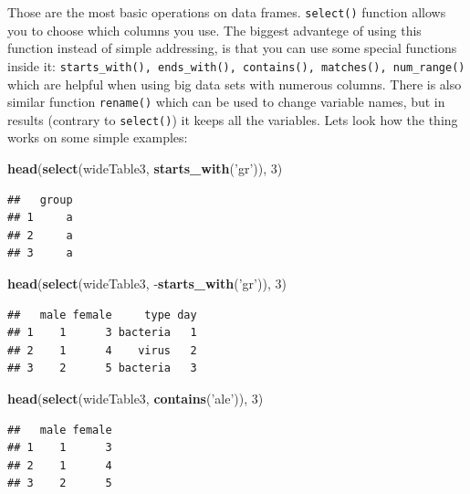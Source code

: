 \documentclass[]{book}
\newenvironment{Shaded}{\begin{snugshade}}{\end{snugshade}}
\newcommand{\KeywordTok}[1]{\textcolor[rgb]{0.12,0.11,0.11}{\textbf{#1}}}
\newcommand{\DecValTok}[1]{\textcolor[rgb]{0.69,0.50,0.00}{#1}}
\newcommand{\StringTok}[1]{\textcolor[rgb]{0.75,0.01,0.01}{#1}}
\newcommand{\OperatorTok}[1]{\textcolor[rgb]{0.12,0.11,0.11}{#1}}
\newcommand{\NormalTok}[1]{\textcolor[rgb]{0.12,0.11,0.11}{#1}}
\theoremstyle{definition}
\theoremstyle{definition}
\theoremstyle{definition}
\theoremstyle{remark}
\begin{document}
Those are the most basic operations on data frames. \texttt{select()}
function allows you to choose which columns you use. The biggest
advantege of using this function instead of simple addressing, is that
you can use some special functions inside it:
\texttt{starts\_with(),\ ends\_with(),\ contains(),\ matches(),\ num\_range()}
which are helpful when using big data sets with numerous columns. There
is also similar function \texttt{rename()} which can be used to change
variable names, but in results (contrary to \texttt{select()}) it keeps
all the variables. Lets look how the thing works on some simple
examples:

\begin{Shaded}
\begin{Highlighting}[]
\KeywordTok{head}\NormalTok{(}\KeywordTok{select}\NormalTok{(wideTable3, }\KeywordTok{starts_with}\NormalTok{(}\StringTok{'gr'}\NormalTok{)), }\DecValTok{3}\NormalTok{)}
\end{Highlighting}
\end{Shaded}

\begin{verbatim}
##   group
## 1     a
## 2     a
## 3     a
\end{verbatim}

\begin{Shaded}
\begin{Highlighting}[]
\KeywordTok{head}\NormalTok{(}\KeywordTok{select}\NormalTok{(wideTable3, }\OperatorTok{-}\KeywordTok{starts_with}\NormalTok{(}\StringTok{'gr'}\NormalTok{)), }\DecValTok{3}\NormalTok{)}
\end{Highlighting}
\end{Shaded}

\begin{verbatim}
##   male female     type day
## 1    1      3 bacteria   1
## 2    1      4    virus   2
## 3    2      5 bacteria   3
\end{verbatim}

\begin{Shaded}
\begin{Highlighting}[]
\KeywordTok{head}\NormalTok{(}\KeywordTok{select}\NormalTok{(wideTable3, }\KeywordTok{contains}\NormalTok{(}\StringTok{'ale'}\NormalTok{)), }\DecValTok{3}\NormalTok{)}
\end{Highlighting}
\end{Shaded}

\begin{verbatim}
##   male female
## 1    1      3
## 2    1      4
## 3    2      5
\end{verbatim}
\end{document}
